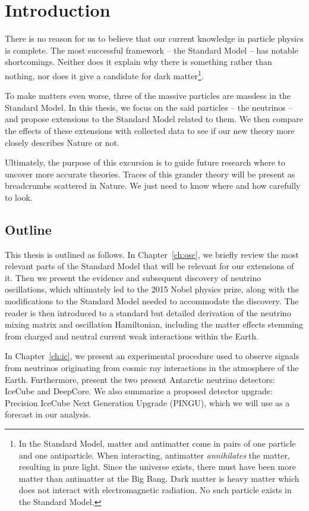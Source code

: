 \chapter{Introduction}
There is no reason for us to believe that our current knowledge in particle physics is complete.
The most successful framework -- the Standard Model -- has notable shortcomings. Neither does it 
explain why there is something rather than nothing, nor does it give a candidate for dark matter\footnote{In the Standard Model,
matter and antimatter come in pairs of one particle and one antiparticle. When interacting,
antimatter \emph{annihilates} the matter, resulting in pure light. Since the universe exists,
there must have been more matter than antimatter at the Big Bang. %
Dark matter is heavy matter which does not interact with electromagnetic radiation.
No such particle exists in the Standard Model.}.

To make matters even worse, three of the massive particles are massless in the Standard Model.
In this thesis, we focus on the said particles -- the neutrinos -- and propose extensions to the Standard Model related to them. 
We then compare the effects of these extensions with collected data to see if our new theory more closely describes Nature or not. 

Ultimately, the purpose of this excursion is to guide future research where to uncover more accurate theories.
Traces of this grander theory will be present as breadcrumbs scattered in Nature. We just need to know where and how carefully to look. 

\section{Outline}
This thesis is outlined as follows. In Chapter~\ref{ch:osc}, we briefly review the most relevant parts of the Standard Model that will be relevant for our extensions of it.
Then we present the evidence and subsequent discovery of neutrino oscillations, which ultimately led to the 2015 Nobel physics prize, along with the modifications to the Standard Model needed to accommodate the discovery.
The reader is then introduced to a standard but detailed derivation of the neutrino mixing matrix and oscillation Hamiltonian, including the matter effects stemming from charged and neutral current weak interactions within the Earth.

In Chapter~\ref{ch:ic}, we present an experimental procedure used to observe signals from neutrinos originating from cosmic ray interactions in the atmosphere of the Earth. 
Furthermore, present the two present Antarctic neutrino detectors: IceCube and DeepCore.
We also summarize a proposed detector upgrade: Precision IceCube Next Generation Upgrade (PINGU), which we will use as a forecast in our analysis.

